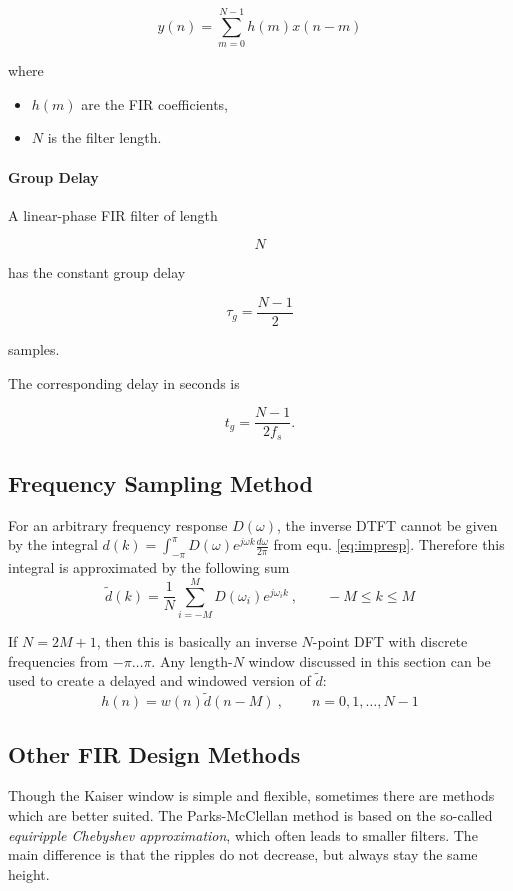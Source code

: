 \[
\boxed{
y(n)=
\sum_{m=0}^{N-1}
h(m)x(n-m)
}
\]

where

\begin{itemize}
\item $h(m)$ are the FIR coefficients,
\item $N$ is the filter length.
\end{itemize}

\paragraph{Group Delay}

A linear-phase FIR filter of length

\[
N
\]

has the constant group delay

\[
\boxed{
\tau_g
=
\frac{N-1}{2}
}
\]

samples.

The corresponding delay in seconds is

\[
\boxed{
t_g
=
\frac{N-1}{2f_s}.
}
\]

\subsection{Frequency Sampling Method}
For an arbitrary frequency response $D(\omega)$, the inverse DTFT cannot
be given by the integral
$d(k) = \int_{-\pi}^{\pi}D(\omega) e^{j\omega k}\frac{d\omega}{2\pi}$
from equ. \ref{eq:impresp}. Therefore this integral is approximated by the
following sum
\begin{equation*}
	\tilde{d}(k) = \frac{1}{N} \sum\limits_{i=-M}^M D(\omega_i) e^{j \omega_i k} \:, \qquad -M \leq k \leq M
\end{equation*}

If $N = 2M+1$, then this is basically an inverse $N$-point DFT with discrete
frequencies from $-\pi \ldots \pi$. Any length-$N$ window discussed in this
section can be used to create a delayed and windowed version of $\tilde{d}$:
\begin{equation*}
	h(n) = w(n) \tilde{d}(n-M) \:, \qquad n = 0,1,\ldots,N-1
\end{equation*}

\subsection{Other FIR Design Methods}
Though the Kaiser window is simple and flexible, sometimes there are methods
which are better suited. The Parks-McClellan method is based on the so-called
\emph{equiripple Chebyshev approximation}, which often leads to smaller filters.
The main difference is that the ripples do not decrease, but always stay the
same height.
